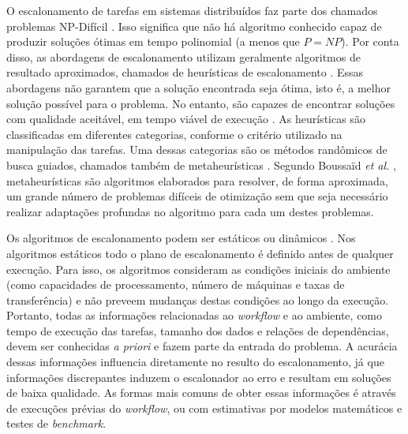 O escalonamento de tarefas em sistemas distribuídos faz parte dos chamados problemas NP-Difícil \cite{Ullman1973}. Isso significa que não há algoritmo conhecido capaz de produzir soluções ótimas em tempo polinomial (a menos que $P=NP$). Por conta disso, as abordagens de escalonamento utilizam geralmente algoritmos de resultado aproximados, chamados de  heurísticas de escalonamento \cite{HEFT, Masdari16, Yu2008}. Essas abordagens não garantem que a solução encontrada seja ótima, isto é, a melhor solução possível para o problema. No entanto, são capazes de encontrar soluções com qualidade aceitável, em tempo viável de execução \cite{Kalra15}. As heurísticas são classificadas em diferentes categorias, conforme o critério utilizado na manipulação das tarefas. Uma dessas categorias são os métodos randômicos de busca guiados, chamados também de metaheurísticas \cite{Kalra15, Bossaid13, tsai14}. Segundo Boussaïd \textit{et al.} \cite{Bossaid13}, metaheurísticas são algoritmos elaborados para resolver, de forma aproximada, um grande número de problemas difíceis de otimização sem que seja necessário realizar adaptações profundas no algoritmo para cada um destes problemas. 

Os algoritmos de escalonamento podem ser estáticos ou dinâmicos \cite{Fakhfakh14}. Nos algoritmos estáticos todo o plano de escalonamento é definido antes de qualquer execução. Para isso, os algoritmos consideram as condições iniciais do ambiente (como capacidades de processamento, número de máquinas e taxas de transferência) e não preveem mudanças destas condições ao longo da execução.  Portanto, todas as informações relacionadas ao \textit{workflow} e ao ambiente, como tempo de execução das tarefas, tamanho dos dados e relações de dependências, devem ser conhecidas \textit{a priori} e fazem parte da entrada do problema. A acurácia dessas informações influencia diretamente no resulto do escalonamento, já que informações discrepantes induzem o escalonador ao erro e resultam em soluções de baixa qualidade. As formas mais comuns de obter essas informações é através de execuções prévias do \textit{workflow}, ou com estimativas por modelos matemáticos e testes de \textit{benchmark}.

